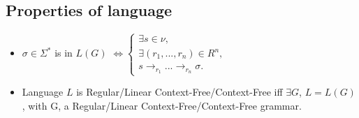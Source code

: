 \documentclass{article}
\begin{document}
\subsection{Properties of language}
\begin{itemize}
    \item $\sigma \in \Sigma^*$ is in $L(G)$ $\iff 
    \begin{cases}
      \exists s \in \nu, \\
      \exists (r_1, ..., r_n) \in R^n, \\
      s \rightarrow_{r_1} ... \rightarrow_{r_n} \sigma.
    \end{cases}$
    \item Language $L$ is Regular/Linear Context-Free/Context-Free iff $\exists G$, $L = L(G)$, with G, a Regular/Linear Context-Free/Context-Free grammar.
\end{itemize}
\end{document}
